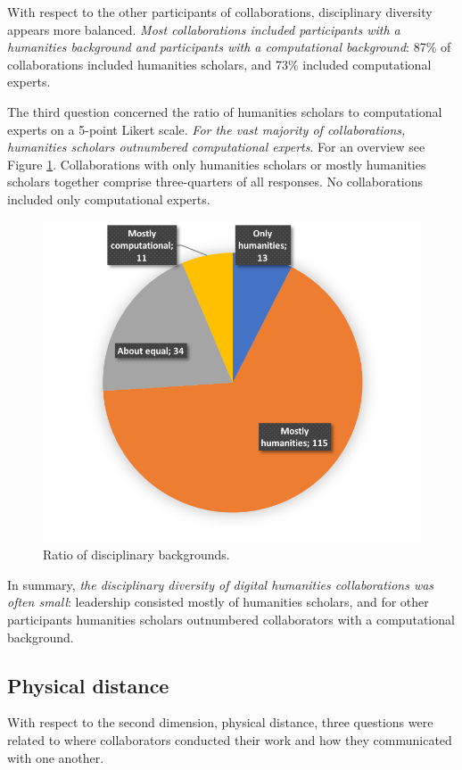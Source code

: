 \documentclass{article}
\begin{document}
With respect to the other participants of collaborations, disciplinary diversity appears more balanced. 
\textit{Most collaborations included participants with a humanities background and participants with a computational background}: 87\% of collaborations included humanities scholars, and 73\% included computational experts.

The third question concerned the ratio of humanities scholars to computational experts on a 5-point Likert scale.
\textit{For the vast majority of collaborations, humanities scholars outnumbered computational experts}. 
For an overview see Figure \ref{fig:piediscdiversity}. Collaborations with only humanities scholars or mostly humanities scholars together comprise three-quarters of all responses. No collaborations included only computational experts.

\begin{figure}  
\begin{center}  
\includegraphics[width=0.6\linewidth]{piediscdiversity.png}  
\caption{Ratio of disciplinary backgrounds.\label{fig:piediscdiversity}}  
\end{center}  
\end{figure}

In summary, \textit{the disciplinary diversity of digital humanities collaborations was often small}: leadership consisted mostly of humanities scholars, and for other participants humanities scholars outnumbered collaborators with a computational background. 

\subsection{Physical distance}
With respect to the second dimension, physical distance, three questions were related to where collaborators conducted their work and how they communicated with one another.
\end{document}
